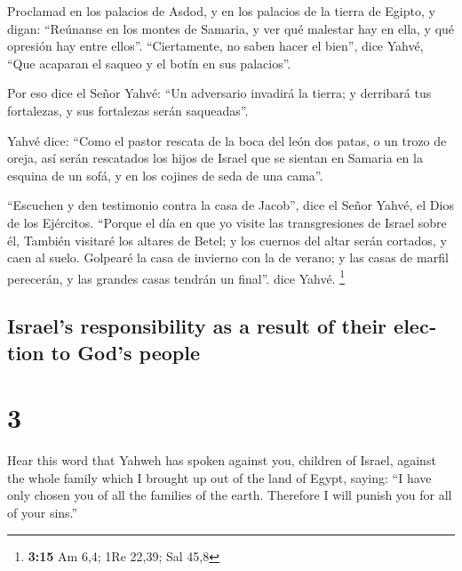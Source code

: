 \begin{paracol}{2}
 Proclamad en los palacios de Asdod, y en los palacios de
la tierra de Egipto, y digan: ``Reúnanse en los montes de Samaria, y ver
qué malestar hay en ella, y qué opresión hay entre ellos''.
 ``Ciertamente, no saben hacer el bien'', dice Yahvé,
``Que acaparan el saqueo y el botín en sus palacios''.

 Por eso dice el Señor Yahvé: ``Un adversario invadirá la
tierra; y derribará tus fortalezas, y sus fortalezas serán saqueadas''.

 Yahvé dice: ``Como el pastor rescata de la boca del león
dos patas, o un trozo de oreja, así serán rescatados los hijos de Israel
que se sientan en Samaria en la esquina de un sofá, y en los cojines de
seda de una cama''.

 ``Escuchen y den testimonio contra la casa de Jacob'',
dice el Señor Yahvé, el Dios de los Ejércitos.  ``Porque
el día en que yo visite las transgresiones de Israel sobre él, También
visitaré los altares de Betel; y los cuernos del altar serán cortados, y
caen al suelo.  Golpearé la casa de invierno con la de
verano; y las casas de marfil perecerán, y las grandes casas tendrán un
final''. dice Yahvé. \footnote{\textbf{3:15} Am 6,4; 1Re 22,39; Sal 45,8}

\switchcolumn
\begin{otherlanguage}{english}

\hypertarget{israels-responsibility-as-a-result-of-their-election-to-gods-people}{%
\subsection{Israel's responsibility as a result of their election to
God's
people}\label{israels-responsibility-as-a-result-of-their-election-to-gods-people}}

\hypertarget{section-5}{%
\section{3}\label{section-5}}

 Hear this word that Yahweh has spoken against you,
children of Israel, against the whole family which I brought up out of
the land of Egypt, saying:  ``I have only chosen you of
all the families of the earth. Therefore I will punish you for all of
your sins.''

\hypertarget{amos-speaks-as-a-prophet-for-compelling-reasons}{%
}
\end{otherlanguage}
\end{paracol}
